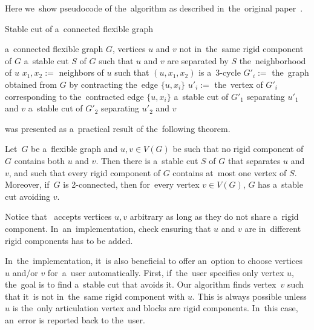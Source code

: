 Here we~show pseudocode of the~algorithm as described
in~the~original paper~\cite{stable_cuts_legersky}.
%
\begin{algorithm}[ht]
	\caption{Stable cut of a~connected flexible graph}%
	\label{alg:stable_cut_flexible}%
	\begin{algorithmic}[1]
		\Require{} a~connected flexible graph $G$, vertices $u$ and $v$ not in~the~same rigid component of $G$
		\Ensure{} a~stable cut $S$ of $G$ such that $u$ and $v$ are separated by $S$
		\State\Return{} the~neighborhood of $u$
		\Else{}
		\State{} $x_1,x_2 :={}$ neighbors of $u$ such that $(u,x_1,x_2)$  is a~$3$-cycle
		\State{} $G'_i :={}$ the~graph obtained from $G$ by contracting the~edge $\{u, x_i\}$
		\State{} $u'_i :={}$ the~vertex of $G'_i$ corresponding to the~contracted edge $\{u, x_i\}$
		\EndFor{}
		\State\Return{} a~stable cut of $G'_1$ separating $u'_1$ and $v$
		\Else{}
		\State\Return{} a~stable cut of $G'_2$ separating $u'_2$ and $v$
		\EndIf{}
		\EndIf{}
	\end{algorithmic}
\end{algorithm}
%

was presented as a~practical result of the~following theorem.
%
\begin{theorem}
	Let~\( G \) be a~flexible graph and \( u, v \in V (G) \) be such that no rigid component of \( G \)
	contains both \( u \) and \( v \). Then there is a~stable cut \( S \) of \( G \) that separates \( u \) and \( v \), and such that
	every rigid component of \( G \) contains at~most one vertex of \( S \). Moreover, if~\( G \) is 2-connected,
	then for~every vertex \( v \in V(G) \), \( G \) has a~stable cut avoiding \( v \).
\end{theorem}
%

Notice that~
accepts vertices \( u, v \) arbitrary as long as they do not share a~rigid component.
In~an~implementation, check ensuring that \( u \) and \( v \)
are in~different rigid components has to be added.

In~the~implementation, it~is also beneficial to offer an~option to choose
vertices \( u \) and/or \(  v \) for~a~user automatically.
First, if~the~user specifies only vertex \( u \), the~goal is to find a~stable cut
that avoids it. Our algorithm finds vertex~\( v \)
such that it~is not in~the~same rigid component with \( u \).
This is always possible unless \( u \) is the~only articulation vertex
and blocks are rigid components. In~this case, an~error is reported back to the~user.

